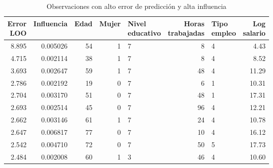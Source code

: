 \begin{table}[ht]
\centering
\begin{tabular}{rrrrlrlr}
  \toprule
\makecell{Error \\ LOO} & Influencia & Edad & Mujer & \makecell{Nivel \\ educativo} & \makecell{Horas \\ trabajadas} & \makecell{Tipo \\ empleo} & \makecell{Log \\ salario} \\ 
  \midrule
8.895 & 0.005026 & 54 & 1 & 7 & 8 & 4 & 4.43 \\ 
  4.715 & 0.002114 & 38 & 1 & 7 & 8 & 4 & 8.52 \\ 
  3.693 & 0.002647 & 59 & 1 & 7 & 48 & 4 & 11.29 \\ 
  2.786 & 0.002192 & 19 & 0 & 7 & 6 & 1 & 10.31 \\ 
  2.704 & 0.003170 & 51 & 0 & 7 & 48 & 1 & 17.31 \\ 
  2.693 & 0.002514 & 45 & 0 & 7 & 96 & 4 & 12.21 \\ 
  2.662 & 0.003146 & 61 & 1 & 7 & 24 & 4 & 10.78 \\ 
  2.647 & 0.006817 & 77 & 0 & 7 & 10 & 4 & 16.12 \\ 
  2.542 & 0.004710 & 72 & 0 & 7 & 50 & 5 & 17.73 \\ 
  2.484 & 0.002008 & 60 & 1 & 3 & 46 & 4 & 10.60 \\ 
   \bottomrule
\end{tabular}
\caption{Observaciones con alto error de predicción y alta influencia} 
\label{tab:problematicas}
\end{table}
